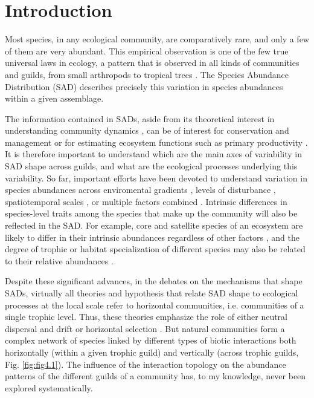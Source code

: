 \section{Introduction}

Most species, in any ecological community, are comparatively rare, and only a few of them are very abundant. This empirical observation is one of the few true universal laws in ecology, a pattern that is observed in all kinds of communities and guilds, from small arthropods \citep{Basset1991} to tropical trees \citep{He1997}. The Species Abundance Distribution (SAD) describes precisely this variation in species abundances within a given assemblage.

The information contained in SADs, aside from its theoretical interest in understanding community dynamics \citep{Hillebrand2008}, can be of interest for conservation and management \citep{Matthews2015} or for estimating ecosystem functions such as primary productivity \citep{Wilsey2000}. It is therefore important to understand which are the main axes of variability in SAD shape across guilds, and what are the ecological processes underlying this variability. So far, important efforts have been devoted to understand variation in species abundances across enviromental gradients \citep{Ulrich2016, Passy2016}, levels of disturbance \citep{Komonen2017}, spatiotemporal scales \citep{Borda-de-Agua2012}, or multiple factors combined \citep{Arellano2017}. Intrinsic differences in species-level traits among the species that make up the community will also be reflected in the SAD. For example, core and satellite species of an ecosystem are likely to differ in their intrinsic abundances regardless of other factors \citep{Magurran2003}, and the degree of trophic or habitat specialization of different species may also be related to their relative abundances \citep{Labra2005, Matthews2015}.

Despite these significant advances, in the debates on the mechanisms that shape SADs, virtually all theories and hypothesis that relate SAD shape to ecological processes at the local scale refer to horizontal communities, i.e. communities of a single trophic level. Thus, these theories emphasize the role of either neutral dispersal and drift \citep{Hubbell2001} or horizontal selection \citep{Vellend2016}. But natural communities form a complex network of species linked by different types of biotic interactions both horizontally (within a given trophic guild) and vertically (across trophic guilds, Fig. \ref{fig:fig4.1}). The influence of the interaction topology on the abundance patterns of the different guilds of a community has, to my knowledge, never been explored systematically.

